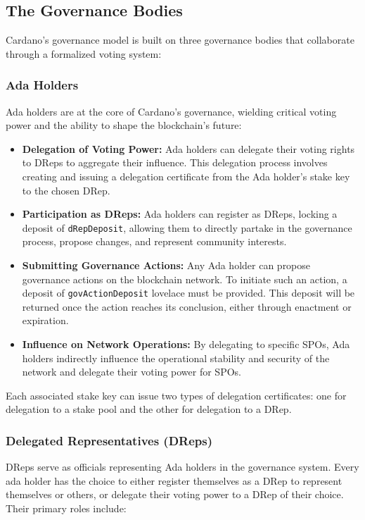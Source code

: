 \subsection{The Governance Bodies}

Cardano's governance model is built on three governance bodies that collaborate through a formalized voting system:

\subsubsection{Ada Holders}
Ada holders are at the core of Cardano's governance, wielding critical voting power and the ability to shape the blockchain's future:

\begin{itemize}
    \item \textbf{Delegation of Voting Power:} Ada holders can delegate their voting rights to DReps to aggregate their influence. This delegation process involves creating and issuing a delegation certificate from the Ada holder's stake key to the chosen DRep.
    \item \textbf{Participation as DReps:} Ada holders can register as DReps, locking a deposit of \texttt{dRepDeposit}, allowing them to directly partake in the governance process, propose changes, and represent community interests.
    \item \textbf{Submitting Governance Actions:} Any Ada holder can propose governance actions on the blockchain network. To initiate such an action, a deposit of \texttt{govActionDeposit} lovelace must be provided. This deposit will be returned once the action reaches its conclusion, either through enactment or expiration.
    \item \textbf{Influence on Network Operations:} By delegating to specific SPOs, Ada holders indirectly influence the operational stability and security of the network and delegate their voting power for SPOs.
\end{itemize}

Each associated stake key can issue two types of delegation certificates: one for delegation to a stake pool and the other for delegation to a DRep.

\subsubsection{Delegated Representatives (DReps)}
DReps serve as officials representing Ada holders in the governance system. Every ada holder has the choice to either register themselves as a DRep to represent themselves or others, or delegate their voting power to a DRep of their choice. Their primary roles include:

